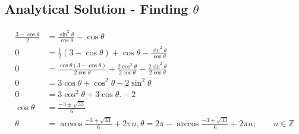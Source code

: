 \documentclass{article}
\begin{document}
\subsection*{Analytical Solution - Finding $\theta$}
\begin{align*}
	\frac{3 - \cos \theta}{2} &= \frac{\sin^2 \theta }{\cos \theta} - \cos \theta \\
	0 &= \frac{1}{2}(3 - \cos \theta ) + \cos \theta  - \frac{\sin^2 \theta}{\cos \theta} \\
	0 &= \frac{\cos \theta (3- \cos \theta)}{2 \cos \theta} + \frac{2\cos^2 \theta }{2\cos \theta} - \frac{2 \sin^2 \theta}{2 \cos \theta }\\
	0 &= 3 \cos \theta + \cos^2 \theta - 2 \sin^2 \theta  \\
		0 &= 3 \cos^2 \theta + 3 \cos \theta. - 2 \\
	\cos\theta &= \frac{-3 \pm \sqrt{33}}{6} \\
	\theta &= \arccos \frac{-3 + \sqrt{33}}{6} + 2 \pi n, \theta = 2\pi - \arccos \frac{-3 + \sqrt{33}}{6} + 2 \pi n; \qquad n \in \mathbb{Z}
	\end{align*}
\end{document}
